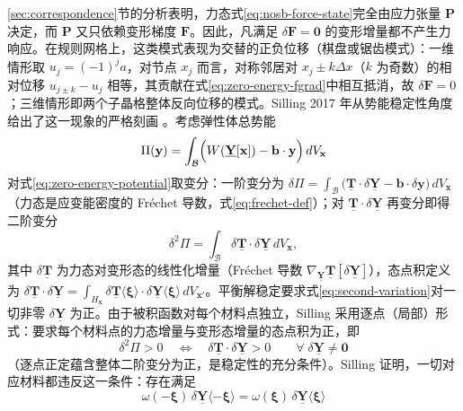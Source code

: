 \ref{sec:correspondence}节的分析表明，力态式\eqref{eq:nosb-force-state}完全由应力张量 $\mathbf{P}$ 决定，而 $\mathbf{P}$ 又只依赖变形梯度 $\mathbf{F}$。因此，凡满足 $\delta\mathbf{F}=\mathbf{0}$ 的变形增量都不产生力响应。在规则网格上，这类模式表现为交替的正负位移（棋盘或锯齿模式）：一维情形取 $u_j=(-1)^j a$，对节点 $x_j$ 而言，对称邻居对 $x_j\pm k\Delta x$（$k$ 为奇数）的相对位移 $u_{j\pm k}-u_j$ 相等，其贡献在式\eqref{eq:zero-energy-fgrad}中相互抵消，故 $\delta\mathbf{F}=0$；三维情形即两个子晶格整体反向位移的模式。Silling 2017 年从势能稳定性角度给出了这一现象的严格刻画 \cite{Silling2017}。考虑弹性体总势能
\begin{equation}
  \Pi(\mathbf{y})=\int_{\mathcal{B}}\Bigl(W(\underline{\mathbf{Y}}[\mathbf{x}])-\mathbf{b}\cdot\mathbf{y}\Bigr)\,dV_{\mathbf{x}}
  \label{eq:zero-energy-potential}
\end{equation}
对式\eqref{eq:zero-energy-potential}取变分：一阶变分为 $\delta\Pi=\int_{\mathcal{B}}\bigl(\underline{\mathbf{T}}\cdot\delta\underline{\mathbf{Y}}-\mathbf{b}\cdot\delta\mathbf{y}\bigr)\,dV_{\mathbf{x}}$（力态是应变能密度的 Fréchet 导数，式\eqref{eq:frechet-def}）；对 $\underline{\mathbf{T}}\cdot\delta\underline{\mathbf{Y}}$ 再变分即得二阶变分
\begin{equation}
  \delta^{2}\Pi=\int_{\mathcal{B}}\delta\underline{\mathbf{T}}\cdot\delta\underline{\mathbf{Y}}\,dV_{\mathbf{x}},
  \label{eq:second-variation}
\end{equation}
其中 $\delta\underline{\mathbf{T}}$ 为力态对变形态的线性化增量（Fréchet 导数 $\nabla_{\underline{\mathbf{Y}}}\underline{\mathbf{T}}[\delta\underline{\mathbf{Y}}]$），态点积定义为 $\delta\underline{\mathbf{T}}\cdot\delta\underline{\mathbf{Y}}=\int_{H_{\mathbf{x}}}\delta\underline{\mathbf{T}}\langle\boldsymbol{\xi}\rangle\cdot\delta\underline{\mathbf{Y}}\langle\boldsymbol{\xi}\rangle\,dV_{\mathbf{x}'}$。平衡解稳定要求式\eqref{eq:second-variation}对一切非零 $\delta\underline{\mathbf{Y}}$ 为正。由于被积函数对每个材料点独立，Silling 采用逐点（局部）形式：要求每个材料点的力态增量与变形态增量的态点积为正，即
\begin{equation}
  \delta^{2}\Pi>0
  \quad\Longleftrightarrow\quad
  \delta\underline{\mathbf{T}}\cdot\delta\underline{\mathbf{Y}}>0
  \qquad\forall\;\delta\underline{\mathbf{Y}}\neq\mathbf{0}
  \label{eq:zero-energy-stability-condition}
\end{equation}
（逐点正定蕴含整体二阶变分为正，是稳定性的充分条件）。Silling 证明，一切对应材料都违反这一条件：存在满足
\begin{equation}
  \omega(-\boldsymbol{\xi})\,\delta\underline{\mathbf{Y}}\langle-\boldsymbol{\xi}\rangle
  =\omega(\boldsymbol{\xi})\,\delta\underline{\mathbf{Y}}\langle\boldsymbol{\xi}\rangle
  \label{eq:zero-energy-nullspace}
\end{equation}
